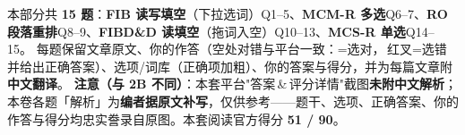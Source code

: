 
\vspace{1mm}
{\small\color{gray} 本部分共 \textbf{15 题}：\textbf{FIB 读写填空}（下拉选词）Q1--5、\textbf{MCM-R 多选}Q6--7、\textbf{RO 段落重排}Q8--9、\textbf{FIBD\&D 读填空}（拖词入空）Q10--13、\textbf{MCS-R 单选}Q14--15。
每题保留文章原文、你的作答（空处对错与平台一致：=选对，{\color{cWrong}}\,红叉=选错并给出正确答案）、选项/词库（正确项加粗）、你的答案与得分，并为每篇文章附\textbf{中文翻译}。
\textbf{注意（与 2B 不同）}：本套平台"答案\,\&\,评分详情"截图\textbf{未附中文解析}；本卷各题「解析」为\textbf{编者据原文补写}，仅供参考——题干、选项、正确答案、你的作答与得分均忠实誊录自原图。本套阅读官方得分 \textbf{51 / 90}。}
\vspace{2mm}

